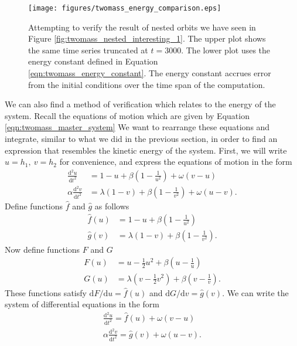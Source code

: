 \documentclass{article}
\begin{document}
\begin{figure}
    \centering
    \texttt{[image: figures/twomass\_energy\_comparison.eps]}
    \caption{
        Attempting to verify the result of nested orbits we have seen in Figure \ref{fig:twomass_nested_interesting_1}.
        The upper plot shows the same time series truncated at $t=3000$.
        The lower plot uses the energy constant defined in Equation \ref{eqn:twomass_energy_constant}.
        The energy constant accrues error from the initial conditions over the time span of the computation.
    }
    \label{fig:twomass_energy_madplot}
\end{figure}

We can also find a method of verification which relates to the energy of the system.
Recall the equations of motion which are given by Equation \ref{eqn:twomass_master_system}
We want to rearrange these equations and integrate, similar to what we did in the previous section, in order to find an expression that resembles the kinetic energy of the system.
First, we will write \(u = h_1,~v=h_2\) for convenience, and express the equations of motion in the form
\begin{align*}
    \frac{\mathrm{d}^2 u}{\mathrm{d}t^2} &= 1 - u + \beta\left(1-\frac{1}{u^2}\right) + \omega(v-u) \\
    \alpha\frac{\mathrm{d}^2 v}{\mathrm{d}t^2} &= \lambda(1 - v) + \beta\left(1-\frac{1}{v^2}\right) + \omega(u-v).
\end{align*}
Define functions $\hat{f}$ and $\hat{g}$ as follows
\begin{align*}
    \hat{f}(u) &= 1-u + \beta\left(1-\frac{1}{u^2}\right) \\
    \hat{g}(v) &= \lambda(1-v) + \beta\left( 1-\frac{1}{v^2} \right).
\end{align*}
Now define functions $F$ and $G$
\begin{align*}
    F(u) &= u - \frac{1}{2}u^2 + \beta\left(u - \frac{1}{u} \right) \\
    G(u) &= \lambda\left( v - \frac{1}{2}v^2 \right) + \beta\left( v - \frac{1}{v}\right).
\end{align*}
These functions satisfy \(\mathrm{d}F/\mathrm{d}u = \hat{f}(u)\) and \(\mathrm{d}G/\mathrm{d}v = \hat{g}(v)\).
We can write the system of differential equations in the form
\begin{align*}
    \frac{\mathrm{d}^2 u}{\mathrm{d}t^2} = \hat{f}(u) + \omega(v-u) \\
    \alpha\frac{\mathrm{d}^2 v}{\mathrm{d}t^2} = \hat{g}(v) + \omega(u-v).
\end{align*}
\end{document}
